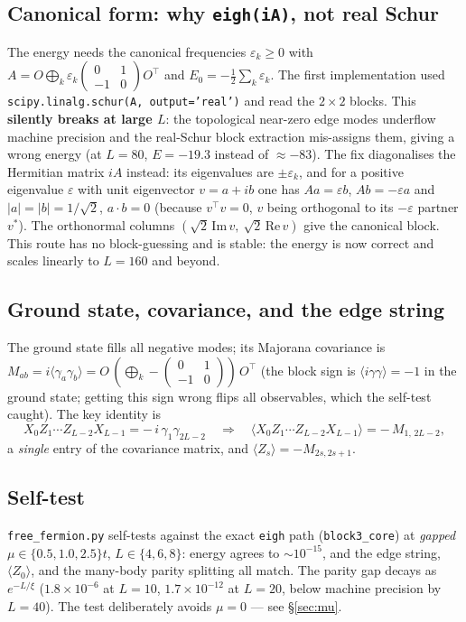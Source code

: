 \documentclass[11pt]{article}
\newcommand{\Oedge}{X_0 Z_1\cdots Z_{L-2} X_{L-1}}
\newcommand{\expv}[1]{\langle #1\rangle}
\newcommand{\code}[1]{\texttt{#1}}
\begin{document}
\subsection{Canonical form: why \code{eigh(iA)}, not real Schur}
The energy needs the canonical frequencies $\varepsilon_k\ge0$ with
$A=O\bigoplus_k\varepsilon_k\!\left(\begin{smallmatrix}0&1\\-1&0\end{smallmatrix}\right)O^{\!\top}$
and $E_0=-\tfrac12\sum_k\varepsilon_k$. The first implementation used
\code{scipy.linalg.schur(A, output='real')} and read the $2\times2$ blocks. This
\textbf{silently breaks at large $L$}: the topological near-zero edge modes
underflow machine precision and the real-Schur block extraction mis-assigns
them, giving a wrong energy (at $L=80$, $E=-19.3$ instead of ${\approx}-83$).
The fix diagonalises the Hermitian matrix $iA$ instead: its eigenvalues are
$\pm\varepsilon_k$, and for a positive eigenvalue $\varepsilon$ with unit
eigenvector $v=a+ib$ one has $Aa=\varepsilon b$, $Ab=-\varepsilon a$ and
$|a|=|b|=1/\sqrt2$, $a\!\cdot\!b=0$ (because $v^\top v=0$, $v$ being orthogonal
to its $-\varepsilon$ partner $v^\ast$). The orthonormal columns
$(\sqrt2\,\mathrm{Im}\,v,\ \sqrt2\,\mathrm{Re}\,v)$ give the canonical block. This
route has no block-guessing and is stable: the energy is now correct and scales
linearly to $L=160$ and beyond.

\subsection{Ground state, covariance, and the edge string}
The ground state fills all negative modes; its Majorana covariance is
$M_{ab}=i\expv{\gamma_a\gamma_b}=O\,(\bigoplus_k
-\!\left(\begin{smallmatrix}0&1\\-1&0\end{smallmatrix}\right))\,O^{\!\top}$ (the block sign
is $\expv{i\gamma\gamma}=-1$ in the ground state; getting this sign wrong flips
all observables, which the self-test caught). The key identity is
\[
\Oedge=-\,i\,\gamma_1\gamma_{2L-2}
\quad\Longrightarrow\quad
\expv{\Oedge}=-\,M_{1,\,2L-2},
\]
a \emph{single} entry of the covariance matrix, and $\expv{Z_s}=-M_{2s,2s+1}$.

\subsection{Self-test}
\code{free\_fermion.py} self-tests against the exact \code{eigh} path
(\code{block3\_core}) at \emph{gapped} $\mu\in\{0.5,1.0,2.5\}t$, $L\in\{4,6,8\}$:
energy agrees to $\sim10^{-15}$, and the edge string, $\expv{Z_0}$, and the
many-body parity splitting all match. The parity gap decays as $e^{-L/\xi}$
($1.8\times10^{-6}$ at $L=10$, $1.7\times10^{-12}$ at $L=20$, below machine
precision by $L=40$). The test deliberately avoids $\mu=0$ --- see
\S\ref{sec:mu}.
\end{document}
